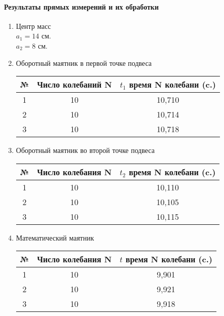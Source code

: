 \documentclass{article}
\begin{document}
\paragraph{Результаты прямых измерений и их обработки }
\begin{enumerate}
	\item Центр масс\\
	$ a_1 = 14 $ см.\\
	$ a_2 = 8$ см.
\item Оборотный маятник в первой точке подвеса

\begin{table}[h]	
\begin{tabular}{|c|c|c|}
	\hline
	№ & Число колебаний N & $t_1$  время N колебани (c.) \\
	\hline
	1 & 10 & 10,710 \\
	\hline
	2 & 10 & 10,714 \\
	\hline
	3 & 10 & 10,718 \\
	\hline
\end{tabular}
\end{table}

\item Оборотный маятник во второй точке подвеса

\begin{table}[!h]
\begin{tabular}{|c|c|c|}
		\hline
		№ & Число колебания N & $t_2$  время N колебани (c.) \\
		\hline
		1 & 10 & 10,110 \\
		\hline
		2 & 10 & 10,105 \\
		\hline
		3 & 10 & 10,115 \\
		\hline
\end{tabular}
\end{table}

\item Математический маятник

\begin{table}[!hpb]
	\begin{tabular}{|c|c|c|}
		\hline
		№ & Число колебания N & $t$  время N колебани (c.) \\
		\hline
		1 & 10 &  9,901\\
		\hline
		2 & 10 & 9,921 \\
		\hline
		3 & 10 & 9,918 \\
		\hline
	\end{tabular}
\end{table}
\end{enumerate}
\end{document}

